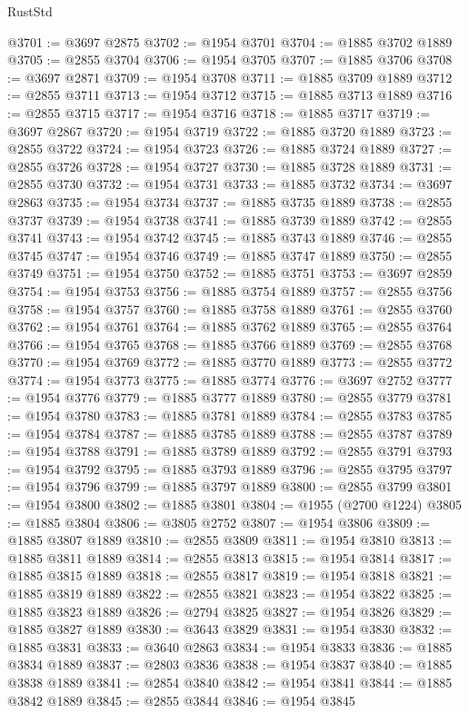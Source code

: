 \begin{lexlean}{RustStd}
\begin{coremodule}
@3701 := @3697 @2875
@3702 := @1954 @3701
@3704 := @1885 @3702 @1889
@3705 := @2855 @3704
@3706 := @1954 @3705
@3707 := @1885 @3706
@3708 := @3697 @2871
@3709 := @1954 @3708
@3711 := @1885 @3709 @1889
@3712 := @2855 @3711
@3713 := @1954 @3712
@3715 := @1885 @3713 @1889
@3716 := @2855 @3715
@3717 := @1954 @3716
@3718 := @1885 @3717
@3719 := @3697 @2867
@3720 := @1954 @3719
@3722 := @1885 @3720 @1889
@3723 := @2855 @3722
@3724 := @1954 @3723
@3726 := @1885 @3724 @1889
@3727 := @2855 @3726
@3728 := @1954 @3727
@3730 := @1885 @3728 @1889
@3731 := @2855 @3730
@3732 := @1954 @3731
@3733 := @1885 @3732
@3734 := @3697 @2863
@3735 := @1954 @3734
@3737 := @1885 @3735 @1889
@3738 := @2855 @3737
@3739 := @1954 @3738
@3741 := @1885 @3739 @1889
@3742 := @2855 @3741
@3743 := @1954 @3742
@3745 := @1885 @3743 @1889
@3746 := @2855 @3745
@3747 := @1954 @3746
@3749 := @1885 @3747 @1889
@3750 := @2855 @3749
@3751 := @1954 @3750
@3752 := @1885 @3751
@3753 := @3697 @2859
@3754 := @1954 @3753
@3756 := @1885 @3754 @1889
@3757 := @2855 @3756
@3758 := @1954 @3757
@3760 := @1885 @3758 @1889
@3761 := @2855 @3760
@3762 := @1954 @3761
@3764 := @1885 @3762 @1889
@3765 := @2855 @3764
@3766 := @1954 @3765
@3768 := @1885 @3766 @1889
@3769 := @2855 @3768
@3770 := @1954 @3769
@3772 := @1885 @3770 @1889
@3773 := @2855 @3772
@3774 := @1954 @3773
@3775 := @1885 @3774
@3776 := @3697 @2752
@3777 := @1954 @3776
@3779 := @1885 @3777 @1889
@3780 := @2855 @3779
@3781 := @1954 @3780
@3783 := @1885 @3781 @1889
@3784 := @2855 @3783
@3785 := @1954 @3784
@3787 := @1885 @3785 @1889
@3788 := @2855 @3787
@3789 := @1954 @3788
@3791 := @1885 @3789 @1889
@3792 := @2855 @3791
@3793 := @1954 @3792
@3795 := @1885 @3793 @1889
@3796 := @2855 @3795
@3797 := @1954 @3796
@3799 := @1885 @3797 @1889
@3800 := @2855 @3799
@3801 := @1954 @3800
@3802 := @1885 @3801
@3804 := @1955 (@2700 @1224)
@3805 := @1885 @3804
@3806 := @3805 @2752
@3807 := @1954 @3806
@3809 := @1885 @3807 @1889
@3810 := @2855 @3809
@3811 := @1954 @3810
@3813 := @1885 @3811 @1889
@3814 := @2855 @3813
@3815 := @1954 @3814
@3817 := @1885 @3815 @1889
@3818 := @2855 @3817
@3819 := @1954 @3818
@3821 := @1885 @3819 @1889
@3822 := @2855 @3821
@3823 := @1954 @3822
@3825 := @1885 @3823 @1889
@3826 := @2794 @3825
@3827 := @1954 @3826
@3829 := @1885 @3827 @1889
@3830 := @3643 @3829
@3831 := @1954 @3830
@3832 := @1885 @3831
@3833 := @3640 @2863
@3834 := @1954 @3833
@3836 := @1885 @3834 @1889
@3837 := @2803 @3836
@3838 := @1954 @3837
@3840 := @1885 @3838 @1889
@3841 := @2854 @3840
@3842 := @1954 @3841
@3844 := @1885 @3842 @1889
@3845 := @2855 @3844
@3846 := @1954 @3845

\end{coremodule}
\end{lexlean}
